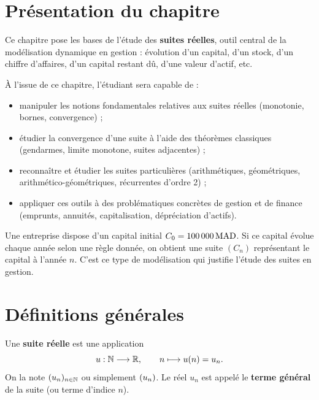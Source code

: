 \documentclass[12pt,a4paper]{article}
\begin{document}

\tableofcontents
\thispagestyle{fancy}
\clearpage

\section*{Présentation du chapitre}

Ce chapitre pose les bases de l'étude des \textbf{suites réelles}, outil central de la modélisation dynamique en gestion : évolution d'un capital, d'un stock, d'un chiffre d'affaires, d'un capital restant dû, d'une valeur d'actif, etc.

\begin{objectifbox}
À l'issue de ce chapitre, l'étudiant sera capable de :
\begin{itemize}
  \item manipuler les notions fondamentales relatives aux suites réelles (monotonie, bornes, convergence) ;
  \item étudier la convergence d'une suite à l'aide des théorèmes classiques (gendarmes, limite monotone, suites adjacentes) ;
  \item reconnaître et étudier les suites particulières (arithmétiques, géométriques, arithmético-géométriques, récurrentes d'ordre 2) ;
  \item appliquer ces outils à des problématiques concrètes de gestion et de finance (emprunts, annuités, capitalisation, dépréciation d'actifs).
\end{itemize}
\end{objectifbox}

\begin{gestionbox}
Une entreprise dispose d'un capital initial $C_0 = 100\,000\,\mathrm{MAD}$. Si ce capital évolue chaque année selon une règle donnée, on obtient une suite $(C_n)$ représentant le capital à l'année $n$. C'est ce type de modélisation qui justifie l'étude des suites en gestion.
\end{gestionbox}

\section{Définitions générales}

\begin{definitionbox}
Une \textbf{suite réelle} est une application
\[
u : \mathbb{N} \longrightarrow \mathbb{R}, \qquad n \longmapsto u(n) = u_n.
\]
On la note $(u_n)_{n\in\mathbb{N}}$ ou simplement $(u_n)$. Le réel $u_n$ est appelé le \textbf{terme général} de la suite (ou terme d'indice $n$).
\end{definitionbox}
\end{document}
